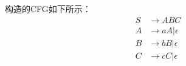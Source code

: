 \begin{solution}
    构造的CFG如下所示：
    \begin{align*}
        S &\rightarrow ABC\\
        A &\rightarrow aA|\epsilon\\
        B &\rightarrow bB|\epsilon\\
        C &\rightarrow cC|\epsilon
    \end{align*}
\end{solution}